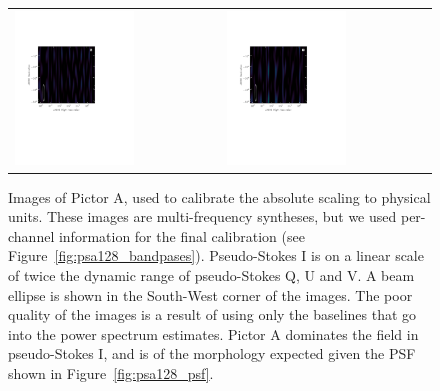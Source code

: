 \begin{figure}
\begin{tabular}{ll}
\includegraphics[clip, trim=0.5cm 9cm 5cm 5cm, width=0.6\textwidth]{chapters/psa128_pol/figures/pretty_U_0-011.pdf} &
\includegraphics[clip, trim=0.5cm 9cm 5cm 5cm, width=0.6\textwidth]{chapters/psa128_pol/figures/pretty_V_0-011.pdf} \\
\end{tabular}
\caption[Images of Pictor A, used to calibrate the absolute scaling to physical units.]{Images of Pictor A, used to calibrate the absolute scaling to physical units. These images are multi-frequency syntheses, but we used per-channel information for the final calibration (see Figure~\ref{fig:psa128_bandpases}). 
Pseudo-Stokes I is on a linear scale of twice the dynamic range of pseudo-Stokes Q, U and V. A beam ellipse is shown in the South-West corner of the images.
The poor quality of the images is a result of using only the baselines that go into the power spectrum estimates. Pictor A dominates the field in pseudo-Stokes I, and is of the morphology expected given the PSF shown in Figure~\ref{fig:psa128_psf}.}
\label{fig:psa128_abscal_images}
\end{figure}

